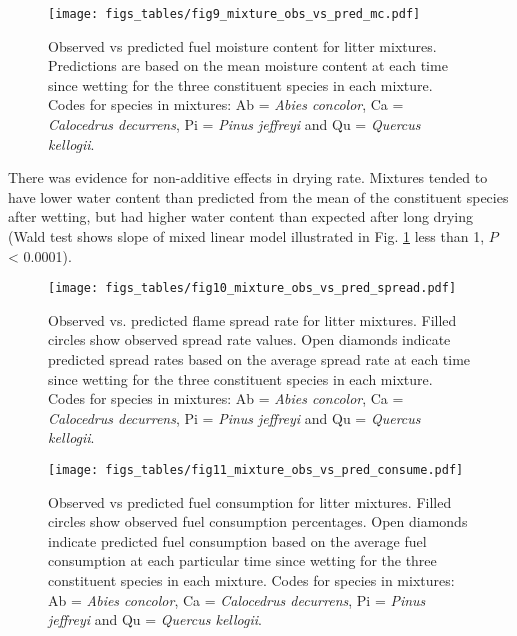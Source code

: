 \documentclass[fire,article,submit,moreauthors,pdftex]{Definitions/mdpi}
\begin{document}


\begin{figure}[H]
  \centering
\texttt{[image: figs\_tables/fig9\_mixture\_obs\_vs\_pred\_mc.pdf]}
\caption{Observed vs predicted fuel moisture content for litter mixtures.
  Predictions are based on the mean moisture content at each time since wetting
  for the three constituent species in each mixture. Codes for species in
  mixtures: Ab = \emph{Abies concolor}, Ca = \emph{Calocedrus decurrens}, Pi =
  \emph{Pinus jeffreyi} and Qu = \emph{Quercus kellogii}.}
  \label{fig:mixture_obs_pred_mc}
\end{figure}

There was evidence for non-additive effects in drying rate. Mixtures tended to have lower water content than predicted from the mean of the constituent species after wetting, but had higher water content than expected after long drying (Wald test shows slope of mixed linear model illustrated in Fig. \ref{fig:mixture_obs_pred_mc} less than 1, $P$ < 0.0001).


\begin{figure}[H]
  \centering
\texttt{[image: figs\_tables/fig10\_mixture\_obs\_vs\_pred\_spread.pdf]}
\caption{Observed vs. predicted flame spread rate for litter mixtures. Filled circles show observed spread rate values. Open diamonds indicate predicted spread rates based on the average spread rate at each time since wetting for the three constituent species in each mixture. Codes for species in mixtures: Ab = \emph{Abies concolor}, Ca = \emph{Calocedrus decurrens}, Pi = \emph{Pinus jeffreyi} and Qu = \emph{Quercus kellogii}.}
  \label{fig:mixture_obs_pred_spread}
\end{figure}


\begin{figure}[H]
  \centering
\texttt{[image: figs\_tables/fig11\_mixture\_obs\_vs\_pred\_consume.pdf]}
\caption{Observed vs predicted fuel consumption for litter mixtures. Filled circles show observed fuel consumption percentages. Open diamonds indicate predicted fuel consumption based on the average fuel consumption at each particular time since wetting for the three constituent species in each mixture. Codes for species in mixtures: Ab = \emph{Abies concolor}, Ca = \emph{Calocedrus decurrens}, Pi = \emph{Pinus jeffreyi} and Qu = \emph{Quercus kellogii}.}
  \label{fig:mixture_obs_pred_consume}
\end{figure}
\end{document}
